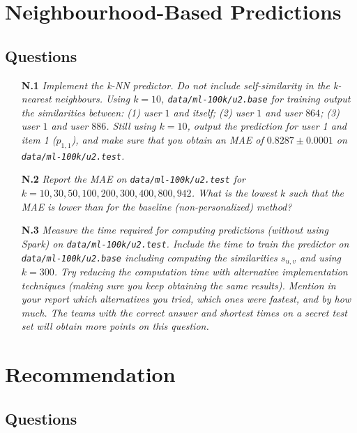 \documentclass{article}
\begin{document}
\section{Neighbourhood-Based Predictions}


\subsection{Questions}
\label{section:q2}

\begin{itemize}    
        \item [\textbf{N.1}] \textit{Implement the k-NN predictor. Do not include self-similarity in the k-nearest neighbours. Using $k=10$,  \texttt{data/ml-100k/u2.base} for training output the similarities between: (1) user $1$ and itself; (2) user $1$ and user $864$; (3) user $1$ and user $886$. Still using $k=10$, output the prediction for user 1 and item 1 ($p_{1,1}$), and make sure that you obtain an MAE of $0.8287 \pm 0.0001$ on \texttt{data/ml-100k/u2.test}.} 
    
    \item [\textbf{N.2}] \textit{Report the MAE on \texttt{data/ml-100k/u2.test} for $k = {10, 30, 50, 100, 200, 300, 400, 800, 942}$. What is the lowest $k$ such that the MAE is lower than for the baseline (non-personalized) method?} 
    
     \item [\textbf{N.3}] \label{q-total-time} \textit{Measure the time required for computing predictions (without using Spark) on \texttt{data/ml-100k/u2.test}. Include the time to train the predictor on \newline \texttt{data/ml-100k/u2.base} including computing the similarities $s_{u,v}$ and using $k=300$. Try reducing the computation time with alternative implementation techniques (making sure you keep obtaining the same results). Mention in your report which alternatives you tried,  which ones were fastest, and by how much. The teams with the correct answer and shortest times on a secret test set will obtain more points on this question.}
\end{itemize}


\section{Recommendation}

\subsection{Questions}
\label{section:q4}
\end{document}
